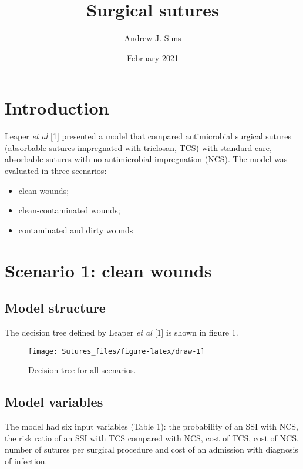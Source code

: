 \documentclass[
]{article}
\title{Surgical sutures}
\author{Andrew J. Sims}
\date{February 2021}
\providecommand{\tightlist}{%
  \setlength{\itemsep}{0pt}\setlength{\parskip}{0pt}}
\begin{document}
\maketitle

\hypertarget{introduction}{%
\section{Introduction}\label{introduction}}

Leaper \emph{et al} {[}1{]} presented a model that compared
antimicrobial surgical sutures (absorbable sutures impregnated with
triclosan, TCS) with standard care, absorbable sutures with no
antimicrobial impregnation (NCS). The model was evaluated in three
scenarios:

\begin{itemize}
\tightlist
\item
  clean wounds;
\item
  clean-contaminated wounds;
\item
  contaminated and dirty wounds
\end{itemize}

\hypertarget{scenario-1-clean-wounds}{%
\section{Scenario 1: clean wounds}\label{scenario-1-clean-wounds}}

\hypertarget{model-structure}{%
\subsection{Model structure}\label{model-structure}}

The decision tree defined by Leaper \emph{et al} {[}1{]} is shown in
figure 1.

\begin{figure}

{\centering \texttt{[image: Sutures\_files/figure-latex/draw-1]} 

}

\caption{Decision tree for all scenarios.}\label{fig:draw}
\end{figure}

\hypertarget{model-variables}{%
\subsection{Model variables}\label{model-variables}}

The model had six input variables (Table 1): the probability of an SSI
with NCS, the risk ratio of an SSI with TCS compared with NCS, cost of
TCS, cost of NCS, number of sutures per surgical procedure and cost of
an admission with diagnosis of infection.
\end{document}
